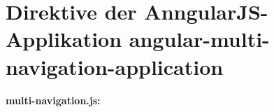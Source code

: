 \begin{Shaded}
\begin{Highlighting}[]
      \OperatorTok{:} \OperatorTok{,}
      \OperatorTok{:} \NormalTok{[}\OperatorTok{\{}
        \OperatorTok{:} \OperatorTok{,}
        \OperatorTok{:} 
      \OperatorTok{\},} \OperatorTok{\{}
        \OperatorTok{:} \OperatorTok{,}
        \OperatorTok{:} 
      \OperatorTok{\},} \OperatorTok{\{}
        \OperatorTok{:} \OperatorTok{,}
        \OperatorTok{:} 
      \OperatorTok{\},} \OperatorTok{\{}
        \OperatorTok{:} \OperatorTok{,}
        \OperatorTok{:} 
      \OperatorTok{\}}\NormalTok{]}
    \OperatorTok{\}}\NormalTok{]}\OperatorTok{;}
  \OperatorTok{\}}\NormalTok{)}\OperatorTok{;}
\end{Highlighting}
\end{Shaded}

\section*{Direktive der AnngularJS-Applikation angular-multi-navigation-application}\label{direktive-der-angular-multi-navigation-application}

\textbf{multi-navigation.js:}

